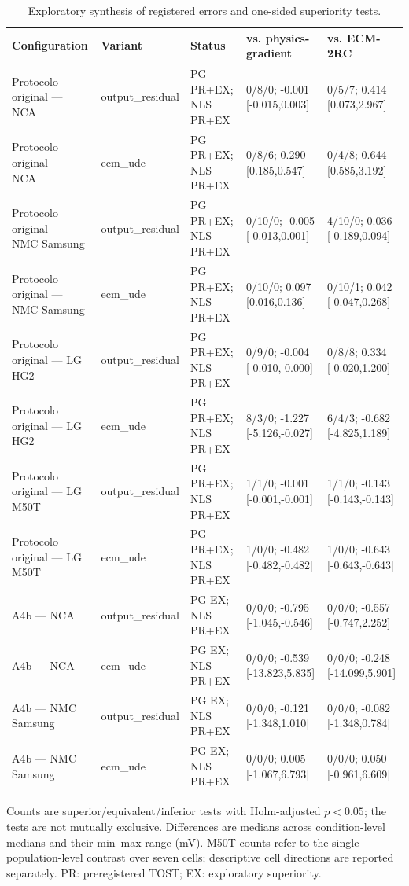 \begin{table}[t]
\centering
\footnotesize
\caption{Exploratory synthesis of registered errors and one-sided superiority tests.}
\label{tab:reviewer-round2-synthesis}
\begin{tabular}{lllll}
\toprule
Configuration & Variant & Status & vs. physics-gradient & vs. ECM-2RC \\
\midrule
Protocolo original — NCA & output_residual & PG PR+EX; NLS PR+EX & 0/8/0; -0.001 [-0.015,0.003] & 0/5/7; 0.414 [0.073,2.967] \\
Protocolo original — NCA & ecm_ude & PG PR+EX; NLS PR+EX & 0/8/6; 0.290 [0.185,0.547] & 0/4/8; 0.644 [0.585,3.192] \\
Protocolo original — NMC Samsung & output_residual & PG PR+EX; NLS PR+EX & 0/10/0; -0.005 [-0.013,0.001] & 4/10/0; 0.036 [-0.189,0.094] \\
Protocolo original — NMC Samsung & ecm_ude & PG PR+EX; NLS PR+EX & 0/10/0; 0.097 [0.016,0.136] & 0/10/1; 0.042 [-0.047,0.268] \\
Protocolo original — LG HG2 & output_residual & PG PR+EX; NLS PR+EX & 0/9/0; -0.004 [-0.010,-0.000] & 0/8/8; 0.334 [-0.020,1.200] \\
Protocolo original — LG HG2 & ecm_ude & PG PR+EX; NLS PR+EX & 8/3/0; -1.227 [-5.126,-0.027] & 6/4/3; -0.682 [-4.825,1.189] \\
Protocolo original — LG M50T & output_residual & PG PR+EX; NLS PR+EX & 1/1/0; -0.001 [-0.001,-0.001] & 1/1/0; -0.143 [-0.143,-0.143] \\
Protocolo original — LG M50T & ecm_ude & PG PR+EX; NLS PR+EX & 1/0/0; -0.482 [-0.482,-0.482] & 1/0/0; -0.643 [-0.643,-0.643] \\
A4b — NCA & output_residual & PG EX; NLS PR+EX & 0/0/0; -0.795 [-1.045,-0.546] & 0/0/0; -0.557 [-0.747,2.252] \\
A4b — NCA & ecm_ude & PG EX; NLS PR+EX & 0/0/0; -0.539 [-13.823,5.835] & 0/0/0; -0.248 [-14.099,5.901] \\
A4b — NMC Samsung & output_residual & PG EX; NLS PR+EX & 0/0/0; -0.121 [-1.348,1.010] & 0/0/0; -0.082 [-1.348,0.784] \\
A4b — NMC Samsung & ecm_ude & PG EX; NLS PR+EX & 0/0/0; 0.005 [-1.067,6.793] & 0/0/0; 0.050 [-0.961,6.609] \\
\bottomrule
\end{tabular}
\vspace{2pt}
\parbox{\textwidth}{\footnotesize Counts are superior/equivalent/inferior tests with Holm-adjusted $p<0.05$; the tests are not mutually exclusive. Differences are medians across condition-level medians and their min--max range (mV). M50T counts refer to the single population-level contrast over seven cells; descriptive cell directions are reported separately. PR: preregistered TOST; EX: exploratory superiority.}
\end{table}
